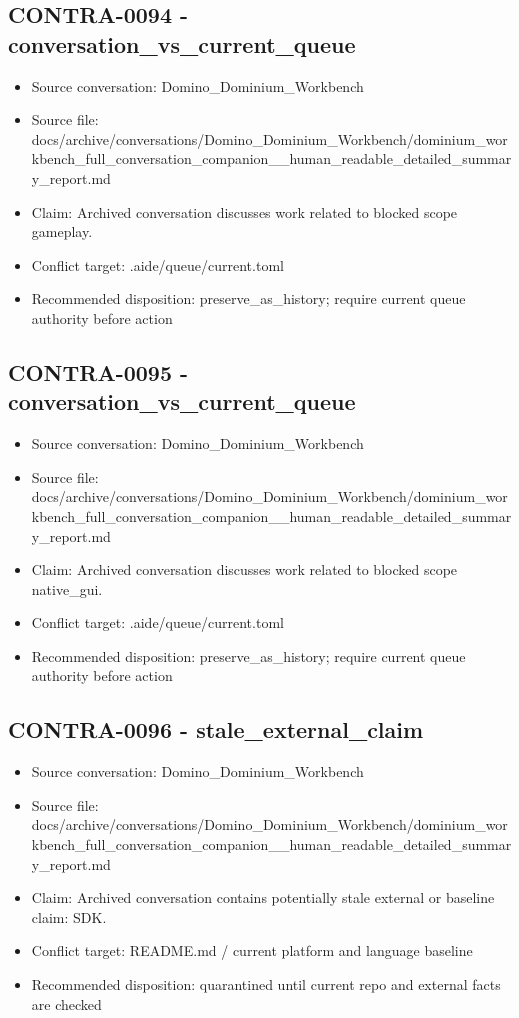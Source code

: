 \documentclass[11pt,a4paper]{report}
\begin{document}
\subsection{CONTRA-0094 - conversation\_vs\_current\_queue}

\begin{itemize}
\item Source conversation: Domino\_Dominium\_Workbench
\item Source file: docs/archive/conversations/Domino\_Dominium\_Workbench/dominium\_workbench\_full\_conversation\_companion\_\_human\_readable\_detailed\_summary\_report.md
\item Claim: Archived conversation discusses work related to blocked scope gameplay.
\item Conflict target: .aide/queue/current.toml
\item Recommended disposition: preserve\_as\_history; require current queue authority before action
\end{itemize}

\subsection{CONTRA-0095 - conversation\_vs\_current\_queue}

\begin{itemize}
\item Source conversation: Domino\_Dominium\_Workbench
\item Source file: docs/archive/conversations/Domino\_Dominium\_Workbench/dominium\_workbench\_full\_conversation\_companion\_\_human\_readable\_detailed\_summary\_report.md
\item Claim: Archived conversation discusses work related to blocked scope native\_gui.
\item Conflict target: .aide/queue/current.toml
\item Recommended disposition: preserve\_as\_history; require current queue authority before action
\end{itemize}

\subsection{CONTRA-0096 - stale\_external\_claim}

\begin{itemize}
\item Source conversation: Domino\_Dominium\_Workbench
\item Source file: docs/archive/conversations/Domino\_Dominium\_Workbench/dominium\_workbench\_full\_conversation\_companion\_\_human\_readable\_detailed\_summary\_report.md
\item Claim: Archived conversation contains potentially stale external or baseline claim: SDK.
\item Conflict target: README.md / current platform and language baseline
\item Recommended disposition: quarantined until current repo and external facts are checked
\end{itemize}
\end{document}
